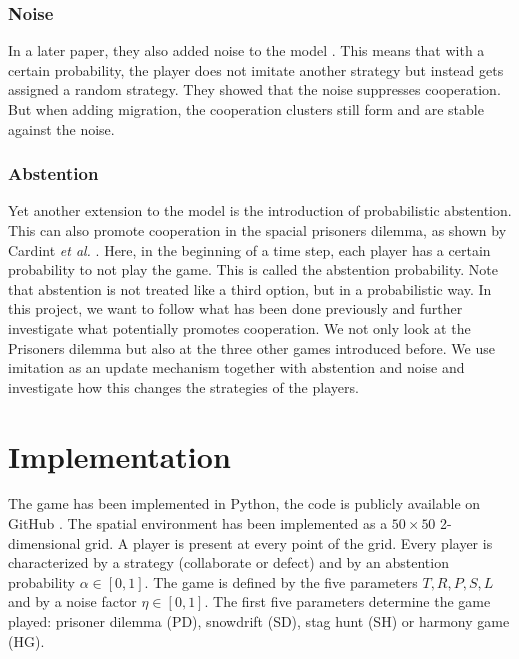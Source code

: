 \documentclass[12pt,oneside,a4paper,fleqn]{article}
\begin{document}
\subsubsection{Noise}
In a later paper, they also added noise to the model \cite{Helbing_2009_noise}. This means that with a certain probability, the player does not imitate another strategy but instead gets assigned a random strategy. They showed that the noise suppresses cooperation. But when adding migration, the cooperation clusters still form and are stable against the noise.

\subsubsection{Abstention}
Yet another extension to the model is the introduction of probabilistic abstention. This can also promote cooperation in the spacial prisoners dilemma, as shown by Cardint \emph{et al.} \cite{cardinot2018}. Here, in the beginning of a time step, each player has a certain probability to not play the game. This is called the abstention probability. Note that abstention is not treated like a third option, but in a probabilistic way.
\newline
\newline
In this project, we want to follow what has been done previously and further investigate what potentially promotes cooperation. We not only look at the Prisoners dilemma but also at the three other games introduced before. We use imitation as an update mechanism together with abstention and noise and investigate how this changes the strategies of the players.


\section{Implementation}
The game has been implemented in Python, the code is publicly available on GitHub \cite{montalti2023}.
The spatial environment has been implemented as a $50 \times 50$ 2-dimensional grid.
A player is present at every point of the grid.
Every player is characterized by a strategy (collaborate or defect) and by an abstention probability $\alpha \in [0,1]$.
The game is defined by the five parameters $T, R,  P, S, L$ and by a noise factor $\eta \in [0,1]$.
The first five parameters determine the game played: prisoner dilemma (PD), snowdrift (SD), stag hunt (SH) or harmony game (HG).
\end{document}
